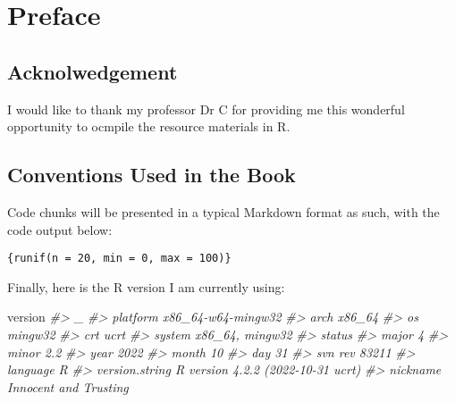 \documentclass[
]{book}
\newenvironment{Shaded}{\begin{snugshade}}{\end{snugshade}}
\newcommand{\CommentTok}[1]{\textcolor[rgb]{0.56,0.35,0.01}{\textit{#1}}}
\newcommand{\NormalTok}[1]{#1}
\begin{document}
\hypertarget{preface}{%
\chapter*{Preface}\label{preface}}

\hypertarget{acknolwedgement}{%
\section{Acknolwedgement}\label{acknolwedgement}}

I would like to thank my professor Dr C for providing me this wonderful opportunity to ocmpile the resource materials in R.

\hypertarget{conventions-used-in-the-book}{%
\section{Conventions Used in the Book}\label{conventions-used-in-the-book}}

Code chunks will be presented in a typical Markdown format as such, with the code output below:

\texttt{\{runif(n\ =\ 20,\ min\ =\ 0,\ max\ =\ 100)\}}

Finally, here is the R version I am currently using:

\begin{Shaded}
\begin{Highlighting}[]
\NormalTok{version}
\CommentTok{\#\textgreater{}                \_                                }
\CommentTok{\#\textgreater{} platform       x86\_64{-}w64{-}mingw32               }
\CommentTok{\#\textgreater{} arch           x86\_64                           }
\CommentTok{\#\textgreater{} os             mingw32                          }
\CommentTok{\#\textgreater{} crt            ucrt                             }
\CommentTok{\#\textgreater{} system         x86\_64, mingw32                  }
\CommentTok{\#\textgreater{} status                                          }
\CommentTok{\#\textgreater{} major          4                                }
\CommentTok{\#\textgreater{} minor          2.2                              }
\CommentTok{\#\textgreater{} year           2022                             }
\CommentTok{\#\textgreater{} month          10                               }
\CommentTok{\#\textgreater{} day            31                               }
\CommentTok{\#\textgreater{} svn rev        83211                            }
\CommentTok{\#\textgreater{} language       R                                }
\CommentTok{\#\textgreater{} version.string R version 4.2.2 (2022{-}10{-}31 ucrt)}
\CommentTok{\#\textgreater{} nickname       Innocent and Trusting}
\end{Highlighting}
\end{Shaded}
\end{document}
